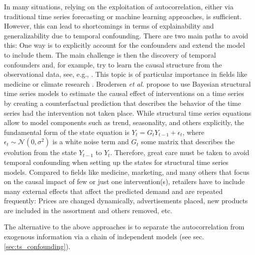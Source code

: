 \documentclass[BCOR=1mm, DIV=calc,10pt,
twoside=true,
twocolumn,
headings=normal]{scrartcl}
\newcommand{\etal}{ {\em et al.}}
\begin{document}
In many situations, relying on the exploitation of autocorrelation, either via traditional time series forecasting or machine learning approaches, is sufficient. However, this can lead to shortcomings in terms of explainability and generalizability due to temporal confounding. There are two main paths to avoid this: One way is to explicitly account for the confounders and extend the model to include them. The main challenge is then the discovery of temporal confounders and, for example, try to learn the causal structure from the observational data, see, e.g., \cite{malinsky2018causal,runge2018causal,Runge2019}. This topic is of particular importance in fields like medicine \cite{bica2020time} or climate research \cite{perrakis2014controlling}. Brodersen \etal \cite{Brodersen2015,GoogleCausalImpact} propose to use Bayesian structural time series models to estimate the causal effect of interventions on a time series by creating a counterfactual prediction that describes the behavior of the time series had the intervention not taken place. While structural time series equations allow to model components such as trend, seasonality, and others explicitly, the fundamental form of the state equation is $Y_t = G_t Y_{t-1} + \epsilon_t$, where $\epsilon_t \sim \mathcal{N}(0,\sigma^2)$ is a white noise term and $G_t$ some matrix that describes the evolution from the state $Y_{t-1}$ to $Y_t$. Therefore, great care must be taken to avoid temporal confounding when setting up the states for structural time series models. Compared to fields like medicine, marketing, and many others that focus on the causal impact of few or just one intervention(s), retailers have to include many external effects that affect the predicted demand and are repeated frequently: Prices are changed dynamically, advertisements placed, new products are included in the assortment and others removed, etc.

\noindent
The alternative to the above approaches is to separate the autocorrelation from exogenous information via a chain of independent models (see sec. \ref{sec:ts_confounding}). 
\end{document}
